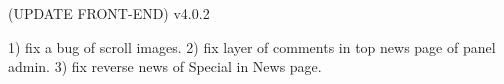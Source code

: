(UPDATE FRONT-END) v4.0.2

1) fix a bug of scroll images.
2) fix layer of comments in top news page of panel admin.
3) fix reverse news of Special in News page.